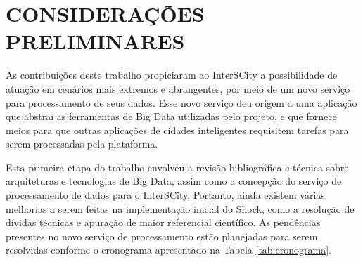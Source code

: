\chapter{CONSIDERAÇÕES PRELIMINARES}
\label{chapter:final}

As contribuições deste trabalho propiciaram ao InterSCity a possibilidade de
atuação em cenários mais extremos e abrangentes, por meio de um novo serviço
para processamento de seus dados. Esse novo serviço deu origem a uma aplicação
que abstrai as ferramentas de Big Data utilizadas pelo projeto, e que fornece
meios para que outras aplicações de cidades inteligentes requisitem tarefas para
serem processadas pela plataforma.

Esta primeira etapa do trabalho envolveu a revisão bibliográfica e técnica
sobre arquiteturas e tecnologias de Big Data, assim como a concepção do serviço
de processamento de dados para o InterSCity. Portanto, ainda existem várias
melhorias a serem feitas na implementação inicial do Shock, como a resolução de
dívidas técnicas e apuração de maior referencial científico. As pendências
presentes no novo serviço de processamento estão planejadas para serem
resolvidas conforme o cronograma apresentado na Tabela \ref{tab:cronograma}.

